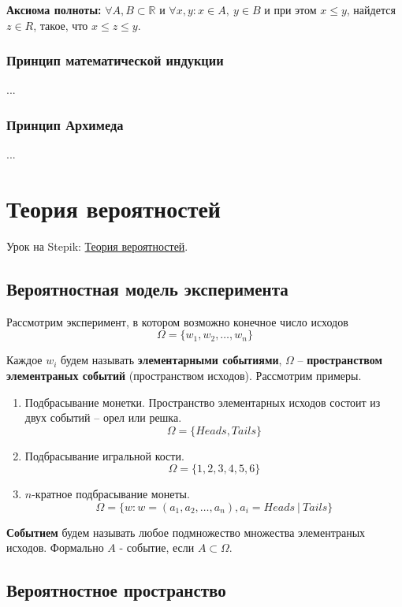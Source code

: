 \documentclass{article}
\begin{document}
\textbf{Аксиома полноты:} $\forall A, B \subset \mathbb{R}$ и $\forall x,y: x \in A, \ y \in B$ и при этом $x \le y$, найдется $z \in R$, такое, что $x \le z \le y$.

\subsubsection{Принцип математической индукции}

...

\subsubsection{Принцип Архимеда}

...

\section{Теория вероятностей}

Урок на Stepik: \href{https://stepik.org/lesson/56519/step/1?unit=34421}{Теория вероятностей}.

\subsection{Вероятностная модель эксперимента}

Рассмотрим эксперимент, в котором возможно конечное число исходов $$\Omega = \{w_1, w_2, \dots, w_n\}$$

Каждое $w_i$ будем называть \textbf{элементарными событиями}, $\Omega$ -- \textbf{пространством элементраных событий} (пространством исходов). Рассмотрим примеры.

\begin{enumerate}
	\item Подбрасывание монетки. Пространство элементарных исходов состоит из двух событий -- орел или решка. $$\Omega = \{Heads, Tails\}$$
	\item Подбрасывание игральной кости. $$\Omega = \{1, 2, 3, 4, 5, 6\}$$
	\item $n$-кратное подбрасывание монеты. $$\Omega = \{w : w = (a_1, a_2, \dots, a_n), a_i  = Heads \ | \ Tails\}$$
\end{enumerate}

\textbf{Событием} будем называть любое подмножество множества элементраных исходов. Формально $A$ - событие, если $A \subset \Omega$.

\subsection{Вероятностное пространство}
\end{document}
